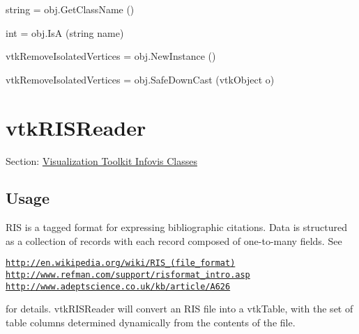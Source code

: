 \begin{DoxyItemize}
\item {\ttfamily string = obj.\-Get\-Class\-Name ()}  
\item {\ttfamily int = obj.\-Is\-A (string name)}  
\item {\ttfamily vtk\-Remove\-Isolated\-Vertices = obj.\-New\-Instance ()}  
\item {\ttfamily vtk\-Remove\-Isolated\-Vertices = obj.\-Safe\-Down\-Cast (vtk\-Object o)}  
\end{DoxyItemize}\hypertarget{vtkinfovis_vtkrisreader}{}\section{vtk\-R\-I\-S\-Reader}\label{vtkinfovis_vtkrisreader}
Section\-: \hyperlink{sec_vtkinfovis}{Visualization Toolkit Infovis Classes} \hypertarget{vtkwidgets_vtkxyplotwidget_Usage}{}\subsection{Usage}\label{vtkwidgets_vtkxyplotwidget_Usage}
R\-I\-S is a tagged format for expressing bibliographic citations. Data is structured as a collection of records with each record composed of one-\/to-\/many fields. See

\href{http://en.wikipedia.org/wiki/RIS_(file_format)}{\tt http\-://en.\-wikipedia.\-org/wiki/\-R\-I\-S\-\_\-(file\-\_\-format)} \href{http://www.refman.com/support/risformat_intro.asp}{\tt http\-://www.\-refman.\-com/support/risformat\-\_\-intro.\-asp} \href{http://www.adeptscience.co.uk/kb/article/A626}{\tt http\-://www.\-adeptscience.\-co.\-uk/kb/article/\-A626}

for details. vtk\-R\-I\-S\-Reader will convert an R\-I\-S file into a vtk\-Table, with the set of table columns determined dynamically from the contents of the file.

